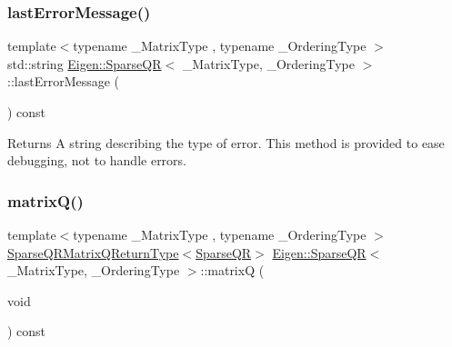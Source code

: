 \subsubsection{\texorpdfstring{lastErrorMessage()}{lastErrorMessage()}}
{\footnotesize\ttfamily template$<$typename \+\_\+\+Matrix\+Type , typename \+\_\+\+Ordering\+Type $>$ \\
std\+::string \mbox{\hyperlink{class_eigen_1_1_sparse_q_r}{Eigen\+::\+Sparse\+QR}}$<$ \+\_\+\+Matrix\+Type, \+\_\+\+Ordering\+Type $>$\+::last\+Error\+Message (\begin{DoxyParamCaption}{ }\end{DoxyParamCaption}) const\hspace{0.3cm}{\ttfamily [inline]}}

\begin{DoxyReturn}{Returns}
A string describing the type of error. This method is provided to ease debugging, not to handle errors. 
\end{DoxyReturn}
\mbox{\label{class_eigen_1_1_sparse_q_r_ae1cc0a836c177d4f42600f8639354be1}} 
\subsubsection{\texorpdfstring{matrixQ()}{matrixQ()}}
{\footnotesize\ttfamily template$<$typename \+\_\+\+Matrix\+Type , typename \+\_\+\+Ordering\+Type $>$ \\
\mbox{\hyperlink{struct_eigen_1_1_sparse_q_r_matrix_q_return_type}{Sparse\+Q\+R\+Matrix\+Q\+Return\+Type}}$<$\mbox{\hyperlink{class_eigen_1_1_sparse_q_r}{Sparse\+QR}}$>$ \mbox{\hyperlink{class_eigen_1_1_sparse_q_r}{Eigen\+::\+Sparse\+QR}}$<$ \+\_\+\+Matrix\+Type, \+\_\+\+Ordering\+Type $>$\+::matrixQ (\begin{DoxyParamCaption}\item[{void}]{ }\end{DoxyParamCaption}) const\hspace{0.3cm}{\ttfamily [inline]}}

